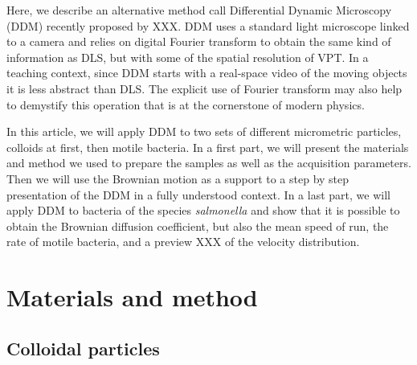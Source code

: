 \documentclass[%
 aip,
 jmp,%
 amsmath,amssymb,
reprint,%
]{revtex4-1}
\begin{document}

 

Here, we describe an alternative method call Differential Dynamic Microscopy (DDM) recently proposed by XXX. DDM uses a standard light microscope linked to a camera and relies on digital Fourier transform to obtain the same kind of information as DLS, but with some of the spatial resolution of VPT. In a teaching context, since DDM starts with a real-space video of the moving objects it is less abstract than DLS. The explicit use of Fourier transform may also help to demystify this operation that is at the cornerstone of modern physics. 

In this article, we will apply DDM to two sets of different micrometric particles, colloids at first, then motile bacteria. In a first part, we will present the materials and method we used to prepare the samples as well as the acquisition parameters. Then we will use the Brownian motion as a support to a step by step presentation of the DDM in a fully understood context. In a last part, we will apply DDM to bacteria of the species \textit{salmonella} and show that it is possible to obtain the Brownian diffusion coefficient, but also the mean speed of run, the rate of motile bacteria, and a preview XXX of the velocity distribution.

\section{Materials and method}


\subsection{Colloidal particles}
\end{document}
